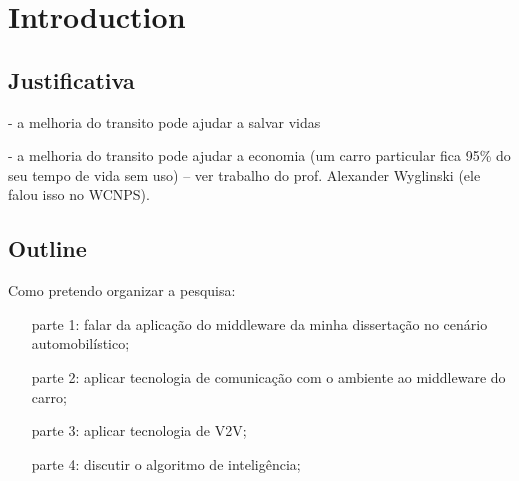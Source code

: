 \chapter{Introduction} \label{chap:introduction}


\section{Justificativa}

- a melhoria do transito pode ajudar a salvar vidas

- a melhoria do transito pode ajudar a economia (um carro particular fica 95\% do seu tempo de vida sem uso) -- ver trabalho do prof. Alexander Wyglinski (ele falou isso no WCNPS).


\section{Outline} \label{sec:intro-outline}

Como pretendo organizar a pesquisa:

\begin{itemize}
    \item[parte 1:] falar da aplicação do middleware da minha dissertação no cenário automobilístico;
    \item[parte 2:] aplicar tecnologia de comunicação com o ambiente ao middleware do carro;
    \item[parte 3:] aplicar tecnologia de V2V;
    \item[parte 4:] discutir o algoritmo de inteligência;
\end{itemize}

